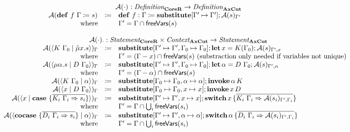 \[
  \begin{array}{rcll}
    \multicolumn{4}{c}{\axcutify{\cdot}{} : \emph{Definition}_{\targetred{}} \rightarrow \emph{Definition}_{\machinelang{}}}\\
    \axcutify{\defi{f\ \Gamma}{s}}{} & \coloneq & \defi{f : \Gamma}{\substitute{\Gamma' \mapsto \Gamma'}{\axcutify{s}{\Gamma'}}} & \\
    \text{where} &  & \Gamma' = \Gamma \cap \free{s} & \\
    \\
    \multicolumn{4}{c}{\axcutify{\cdot}{\cdot} : \emph{Statement}_{\targetred{}} \times \emph{Context}_{\machinelang{}} \rightarrow \emph{Statement}_{\machinelang{}}}\\
    \axcutify{\cut{K\ \Gamma_0}{\tilde{\mu}x.s}}{\Gamma} & \coloneq & \substitute{\Gamma' \mapsto \Gamma', \Gamma_0 \mapsto \Gamma_0}{\letac{x}{K(\Gamma_0)}{\axcutify{s}{\Gamma', x}}} & \\
    \text{where} &  & \Gamma' = (\Gamma - x) \cap \free{s} \text{ (substraction only needed if variables not unique)} & \\
    \axcutify{\cut{\mu\alpha.s}{D\ \Gamma_0}}{\Gamma} & \coloneq & \substitute{\Gamma' \mapsto \Gamma', \Gamma_0 \mapsto \Gamma_0}{\letac{\alpha}{D\ \Gamma_0}{\axcutify{s}{\Gamma', \alpha}}} & \\
    \text{where} &  & \Gamma' = (\Gamma - \alpha) \cap \free{s} & \\
    \axcutify{\cut{K\ \Gamma_0}{\alpha}}{\Gamma} & \coloneq & \substitute{\Gamma_0 \mapsto \Gamma_0, \alpha \mapsto \alpha}{\invoke{\alpha}{K}} & \\
    \axcutify{\cut{x}{D\ \Gamma_0}}{\Gamma} & \coloneq & \substitute{\Gamma_0 \mapsto \Gamma_0, x \mapsto x}{\invoke{x}{D}} & \\
    \axcutify{\cut{x}{\case{\overline{K_i\ \Gamma_i \Rightarrow s_i}}}}{\Gamma} & \coloneq & \substitute{\Gamma' \mapsto \Gamma', x \mapsto x}{\switch{x}{\bra{\overline{K_i\ \Gamma_i \Rightarrow \axcutify{s_i}{\Gamma', \Gamma_i}}}}} & \\
    \text{where} &  & \Gamma' = \Gamma \cap \bigcup_i \free{s_i} & \\
    \axcutify{\cut{\cocase{\overline{D_i\ \Gamma_i \Rightarrow s_i}}}{\alpha}}{\Gamma} & \coloneq & \substitute{\Gamma' \mapsto \Gamma', \alpha \mapsto \alpha}{\switch{\alpha}{\bra{\overline{D_i\ \Gamma_i \Rightarrow \axcutify{s_i}{\Gamma', \Gamma_i}}}}} & \\
    \text{where} &  & \Gamma' = \Gamma \cap \bigcup_i \free{s_i} & \\

\end{array}\]
